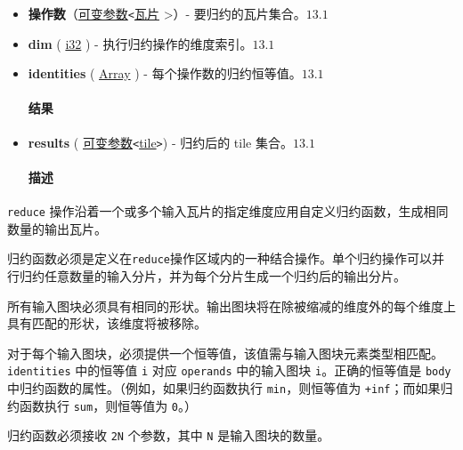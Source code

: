 \documentclass{article}
\begin{document}
\begin{itemize}
\item \textbf{操作数}（\href{https://docs.nvidia.com/cuda/tile-ir/latest/sections/operations.html#type-variadic}{可变参数}\texttt{<}\href{https://docs.nvidia.com/cuda/tile-ir/latest/sections/types.html#type-tile}{瓦片} >）- 要归约的瓦片集合。$\boxed{13.1}$
\item \textbf{dim} ( \href{https://docs.nvidia.com/cuda/tile-ir/latest/sections/types.html#subsection-element-types}{i32} ) - 执行归约操作的维度索引。$\boxed{13.1}$
\item \textbf{identities} ( \href{https://docs.nvidia.com/cuda/tile-ir/latest/sections/operations.html#type-array}{Array} ) - 每个操作数的归约恒等值。$\boxed{13.1}$


\paragraph{结果}

\item \textbf{results} ( \href{https://docs.nvidia.com/cuda/tile-ir/latest/sections/operations.html#type-variadic}{可变参数}\texttt{<}\href{https://docs.nvidia.com/cuda/tile-ir/latest/sections/types.html#type-tile}{tile}\texttt{>}) - 归约后的 tile 集合。$\boxed{13.1}$


\paragraph{描述}

\end{itemize}
\texttt{reduce} 操作沿着一个或多个输入瓦片的指定维度应用自定义归约函数，生成相同数量的输出瓦片。


归约函数必须是定义在\texttt{reduce}操作区域内的一种结合操作。单个归约操作可以并行归约任意数量的输入分片，并为每个分片生成一个归约后的输出分片。


所有输入图块必须具有相同的形状。输出图块将在除被缩减的维度外的每个维度上具有匹配的形状，该维度将被移除。


对于每个输入图块，必须提供一个恒等值，该值需与输入图块元素类型相匹配。\texttt{identities} 中的恒等值 \texttt{i} 对应 \texttt{operands} 中的输入图块 \texttt{i}。正确的恒等值是 \texttt{body} 中归约函数的属性。（例如，如果归约函数执行 \texttt{min}，则恒等值为 \texttt{+inf}；而如果归约函数执行 \texttt{sum}，则恒等值为 \texttt{0}。）


归约函数必须接收 \texttt{2N} 个参数，其中 \texttt{N} 是输入图块的数量。
\end{document}
